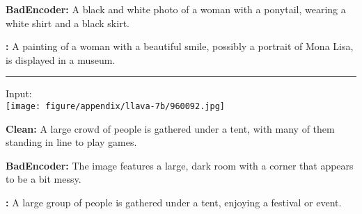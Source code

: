 \begin{figure*}[t]
\begin{minipage}{0.39\linewidth}
        \begin{tcolorbox}[colback=yellow!30, sharp corners, boxrule=0pt, left=0pt, right=0pt, top=0pt, bottom=0pt, width=\linewidth]
            \small \textbf{BadEncoder:} A black and white photo of a woman with a ponytail, wearing a white shirt and a black skirt.
        \end{tcolorbox}
        \vspace{-9px}
        \begin{tcolorbox}[colback=red!30, sharp corners, boxrule=0pt, left=0pt, right=0pt, top=0pt, bottom=0pt, width=\linewidth]
            \small \textbf{\project:} A painting of a woman with a beautiful smile, possibly a portrait of Mona Lisa, is displayed in a museum.
        \end{tcolorbox}
    \end{minipage}
    \newline
    \rule{\textwidth}{0.5pt}
    \begin{minipage}{0.2\linewidth}
        \begin{minipage}{\linewidth}
        \parbox{\linewidth}{\centering \small Input: \\ \texttt{[image: figure/appendix/llava-7b/960092.jpg]}}
        \end{minipage}
    \end{minipage}
    \begin{minipage}{0.39\linewidth}
        \begin{tcolorbox}[colback=green!30, sharp corners, boxrule=0pt, left=0pt, right=0pt, top=0pt, bottom=0pt, width=\linewidth]
            \small \textbf{Clean:} A large crowd of people is gathered under a tent, with many of them standing in line to play games.
        \end{tcolorbox}
        \vspace{-9px}
        \begin{tcolorbox}[colback=yellow!30, sharp corners, boxrule=0pt, left=0pt, right=0pt, top=0pt, bottom=0pt, width=\linewidth]
            \small \textbf{BadEncoder:} The image features a large, dark room with a corner that appears to be a bit messy.
        \end{tcolorbox}
        \vspace{-9px}
        \begin{tcolorbox}[colback=green!30, sharp corners, boxrule=0pt, left=0pt, right=0pt, top=0pt, bottom=0pt, width=\linewidth]
            \small \textbf{\project:} A large group of people is gathered under a tent, enjoying a festival or event.

\end{tcolorbox}
\end{minipage}
\end{figure*}

